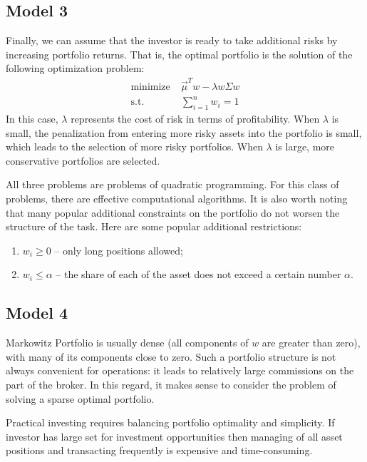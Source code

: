 \documentclass{article}
\begin{document}
\subsection*{Model 3}
Finally, we can assume that the investor is ready to take additional risks by increasing portfolio returns. That is, the optimal portfolio is the solution of the following optimization problem:
\begin{align}
\mathrm{minimize} &\; \vec{\mu}^T w - \lambda w \Sigma w \label{eq:3} \\
\mathrm{s.t.} &\;\sum_{i=1}^n w_i = 1 \nonumber
\end{align}
In this case, $\lambda$ represents the cost of risk in terms of profitability. When $\lambda$ is small, the penalization from entering more risky assets into the portfolio is small, which leads to the selection of more risky portfolios. When $\lambda$ is large, more conservative portfolios are selected.

All three problems are problems of quadratic programming. For this class of problems, there are effective computational algorithms. It is also worth noting that many popular additional constraints on the portfolio do not worsen the structure of the task. Here are some popular additional restrictions:
\begin{enumerate}
\item $w_i \geq 0 $ -- only long positions allowed;
\item $w_i \leq \alpha$ -- the share of each of the asset does not exceed a certain number $\alpha$.
\end{enumerate}
\subsection*{Model 4}
Markowitz Portfolio is usually dense (all components of $w$ are greater than zero), with many of its components close to zero. Such a portfolio structure is not always convenient for operations: it leads to relatively large commissions on the part of the broker. In this regard, it makes sense to consider the problem of solving a sparse optimal portfolio. 

Practical investing requires balancing portfolio optimality and simplicity. If investor has large set for investment opportunities then managing of all asset positions and transacting frequently is expensive and time-consuming.
\end{document}
